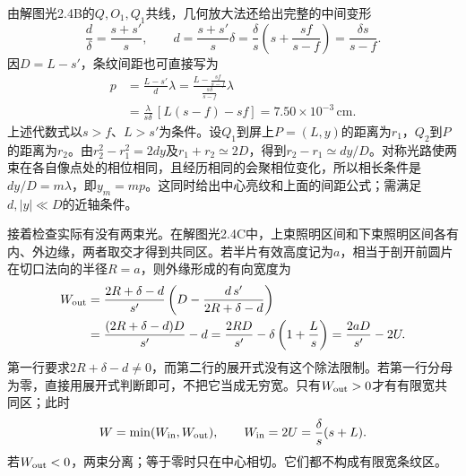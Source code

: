 \documentclass[UTF8,fontset=fandol,a4paper,11pt]{ctexart}
\begin{document}
由解图光2.4B的$Q,O_1,Q_1$共线，几何放大法还给出完整的中间变形
\[
\frac d\delta=\frac{s+s'}s,\qquad
d=\frac{s+s'}s\delta
=\frac\delta s\left(s+\frac{sf}{s-f}\right)
=\frac{\delta s}{s-f}.
\]
因$D=L-s'$，条纹间距也可直接写为
\[
\begin{aligned}
p&=\frac{L-s'}d\lambda
=\frac{L-\frac{sf}{s-f}}{\frac{s\delta}{s-f}}\lambda\\
&=\frac{\lambda}{s\delta}\,[L(s-f)-sf]
=7.50\times10^{-3}\,\mathrm{cm}.
\end{aligned}
\]
上述代数式以$s>f$、$L>s'$为条件。设$Q_1$到屏上$P=(L,y)$的距离为$r_1$，$Q_2$到$P$的距离为$r_2$。由$r_2^2-r_1^2=2dy$及$r_1+r_2\simeq2D$，得到$r_2-r_1\simeq dy/D$。对称光路使两束在各自像点处的相位相同，且经历相同的会聚相位变化，所以相长条件是$dy/D=m\lambda$，即$y_m=mp$。这同时给出中心亮纹和上面的间距公式；需满足$d,|y|\ll D$的近轴条件。

接着检查实际有没有两束光。在解图光2.4C中，上束照明区间和下束照明区间各有内、外边缘，两者取交才得到共同区。若半片有效高度记为$a$，相当于剖开前圆片在切口法向的半径$R=a$，则外缘形成的有向宽度为
\[
\begin{aligned}
W_{\rm out}
&=\frac{2R+\delta-d}{s'}
 \left(D-\frac{d\,s'}{2R+\delta-d}\right)\\
&=\frac{(2R+\delta-d)D}{s'}-d
=\frac{2RD}{s'}-\delta\left(1+\frac Ls\right)
=\frac{2aD}{s'}-2U.
\end{aligned}
\]
第一行要求$2R+\delta-d\ne0$，而第二行的展开式没有这个除法限制。若第一行分母为零，直接用展开式判断即可，不把它当成无穷宽。只有$W_{\rm out}>0$才有有限宽共同区；此时
\[
W=\min(W_{\rm in},W_{\rm out}),\qquad
W_{\rm in}=2U=\frac\delta s(s+L).
\]
若$W_{\rm out}<0$，两束分离；等于零时只在中心相切。它们都不构成有限宽条纹区。
\end{document}
